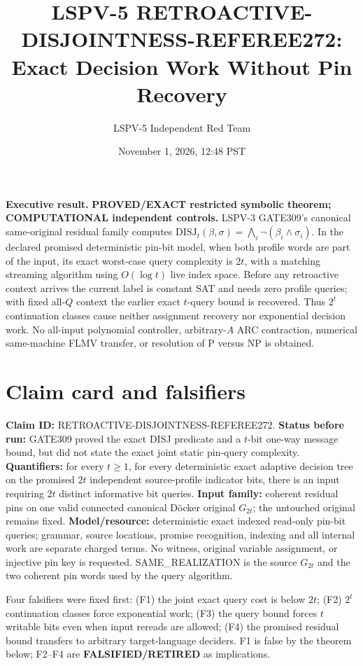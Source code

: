 \documentclass[11pt]{article}
\title{LSPV-5 RETROACTIVE-DISJOINTNESS-REFEREE272:\\Exact Decision Work Without Pin Recovery}
\author{LSPV-5 Independent Red Team}
\date{November 1, 2026, 12:48 PST}
\begin{document}
\maketitle

\noindent\textbf{Executive result.}
\textbf{PROVED/EXACT restricted symbolic theorem; COMPUTATIONAL independent controls.}
LSPV-3 GATE309's canonical same-original residual family computes
$\mathrm{DISJ}_t(\beta,\sigma)=\bigwedge_i\neg(\beta_i\land\sigma_i)$.
In the declared promised deterministic pin-bit model, when both profile words are
part of the input, its exact worst-case query complexity is $2t$, with a matching
streaming algorithm using $O(\log t)$ live index space.  Before any retroactive
context arrives the current label is constant SAT and needs zero profile queries;
with fixed all-$Q$ context the earlier exact $t$-query bound is recovered.
Thus $2^t$ continuation classes cause neither assignment recovery nor exponential
decision work.  No all-input polynomial controller, arbitrary-$A$ ARC contraction,
numerical same-machine FLMV transfer, or resolution of P versus NP is obtained.

\section{Claim card and falsifiers}
\textbf{Claim ID:} RETROACTIVE-DISJOINTNESS-REFEREE272.
\textbf{Status before run:} GATE309 proved the exact DISJ predicate and a $t$-bit
one-way message bound, but did not state the exact joint static pin-query complexity.
\textbf{Quantifiers:} for every $t\ge1$, for every deterministic exact adaptive
decision tree on the promised $2t$ independent source-profile indicator bits, there
is an input requiring $2t$ distinct informative bit queries.
\textbf{Input family:} coherent residual pins on one valid connected canonical
D\"ocker original $G_{2t}$; the untouched original remains fixed.
\textbf{Model/resource:} deterministic exact indexed read-only pin-bit queries;
grammar, source locations, promise recognition, indexing and all internal work are
separate charged terms.  No witness, original variable assignment, or injective pin
key is requested.  SAME\_REALIZATION is the source $G_{2t}$ and the two coherent
pin words used by the query algorithm.

Four falsifiers were fixed first: (F1) the joint exact query cost is below $2t$;
(F2) $2^t$ continuation classes force exponential work; (F3) the query bound forces
$t$ writable bits even when input rereads are allowed; (F4) the promised residual
bound transfers to arbitrary target-language deciders.  F1 is false by the theorem
below; F2--F4 are \textbf{FALSIFIED/RETIRED} as implications.
\end{document}

